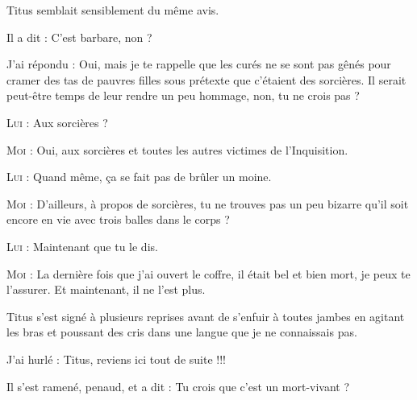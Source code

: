 Titus semblait sensiblement du même avis.

\begin{dialogue}

Il a dit : C’est barbare, non ?

J’ai répondu : Oui, mais je te rappelle que les curés ne se sont pas gênés pour cramer des tas de pauvres filles sous prétexte que c’étaient des sorcières. Il serait peut-être temps de leur rendre un peu hommage, non, tu ne crois pas ?

\textsc{Lui} : Aux sorcières ?

\textsc{Moi} : Oui, aux sorcières et toutes les autres victimes de l’Inquisition.

\textsc{Lui} : Quand même, ça se fait pas de brûler un moine.

\textsc{Moi} : D’ailleurs, à propos de sorcières, tu ne trouves pas un peu bizarre qu’il soit encore en vie avec trois balles dans le corps ?

\textsc{Lui} : Maintenant que tu le dis.

\textsc{Moi} : La dernière fois que j’ai ouvert le coffre, il était bel et bien mort, je peux te l’assurer. Et maintenant, il ne l’est plus.

Titus s’est signé à plusieurs reprises avant de s’enfuir à toutes jambes en agitant les bras et poussant des cris dans une langue que je ne connaissais pas.

J’ai hurlé : Titus, reviens ici tout de suite !!!

Il s’est ramené, penaud, et a dit : Tu crois que c’est un mort-vivant ?

\end{dialogue}


